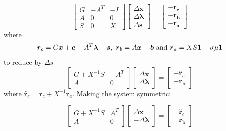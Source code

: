 \documentclass[12pt,a4paper,twoside]{report}
\begin{document}
\begin{equation}
	\begin{bmatrix}
	G &-A^T & -I\\
	A & 0 & 0 \\
	S & 0  & X
	\end{bmatrix} 
	\begin{bmatrix}
	\Delta\boldsymbol{x} \\ \Delta\boldsymbol{\lambda} \\ \Delta\boldsymbol{s}
	\end{bmatrix} =
		\begin{bmatrix}
		\boldsymbol{-r_c} \\ \boldsymbol{-r_b} \\ \boldsymbol{-r_a}
		\end{bmatrix}
\end{equation}
where 
\begin{equation}
\boldsymbol{r}_c = G\boldsymbol{x} + \boldsymbol{c}-A^T\boldsymbol{\lambda} - \boldsymbol{s}, \ 
\boldsymbol{r}_b = A\boldsymbol{x}-\boldsymbol{b} \ \textnormal{and} \ 
\boldsymbol{r}_a = XS\boldsymbol{1}- \sigma\mu \boldsymbol{1}
\end{equation}
to reduce by $\Delta s$
\begin{equation}
	\begin{bmatrix}
	G+X^{-1}S &-A^T \\
	A & 0  
	\end{bmatrix} 
	\begin{bmatrix}
	\Delta\boldsymbol{x} \\ \Delta\boldsymbol{\lambda} 
	\end{bmatrix} =
	\begin{bmatrix}
	-\hat{\boldsymbol{r}}_c \\ \boldsymbol{-r_b} 
	\end{bmatrix}
\end{equation}
where $\hat{\boldsymbol{r}}_c = \boldsymbol{r}_c + X^{-1}\boldsymbol{r}_a$. Making the system symmetric:


\begin{equation}
\begin{bmatrix}
G+X^{-1}S &A^T \\
A & 0  
\end{bmatrix} 
\begin{bmatrix}
\Delta\boldsymbol{x} \\ -\Delta\boldsymbol{\lambda} 
\end{bmatrix} =
\begin{bmatrix}
-\hat{\boldsymbol{r}}_c \\ \boldsymbol{-r_b} 
\end{bmatrix}
\end{equation}
\end{document}

